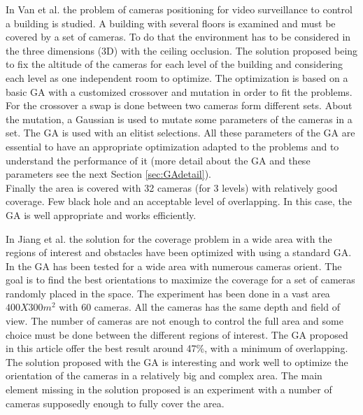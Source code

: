 In Van et al. \cite{83*van2009} the problem of cameras positioning for video surveillance to control a building is studied. A building with several floors is examined and must be covered by a set of cameras. To do that the environment has to be considered in the three dimensions (3D) with the ceiling occlusion. The solution proposed being to fix the altitude of the cameras for each level of the building and considering each level as one independent room to  optimize. 
The optimization is based on a basic GA with a customized crossover and mutation in order to fit the problems. 
For the crossover a swap is done between two cameras form different sets.%
 About the mutation, a Gaussian is used to mutate some parameters of the cameras in a set. The GA is used with an elitist selections. All these parameters of the GA are essential to have an appropriate optimization adapted  to the problems and to understand the performance of it (more detail about the GA and these parameters see the next Section \ref{sec:GAdetail}).  \\ 
Finally the area is covered with 32 cameras (for 3 levels) with relatively good coverage. Few black hole and an acceptable level of overlapping. In this case, the GA is well appropriate and works efficiently.

In Jiang et al. \cite{165*jiang2010} the solution for the coverage problem in a wide area with the regions of interest and obstacles have been optimized with using a standard GA. In \cite{165*jiang2010} the GA has been tested for a wide area with numerous cameras orient. The goal is to find the best orientations to maximize the coverage for a set of cameras  randomly placed in the space. The experiment has been done in a vast area $400X300m^2$ with 60 cameras.
 All the cameras has the same depth and field of view. The number of cameras are not enough to control the full area and some choice must be done between the different regions of interest. The GA proposed in this article offer the best result around 47\%, with a minimum of overlapping. \\
The solution proposed with the GA is interesting and work well to optimize the orientation of the cameras in  a relatively big and complex area. The main element missing in the solution proposed is an experiment with a number of cameras supposedly enough to fully cover the area. 

